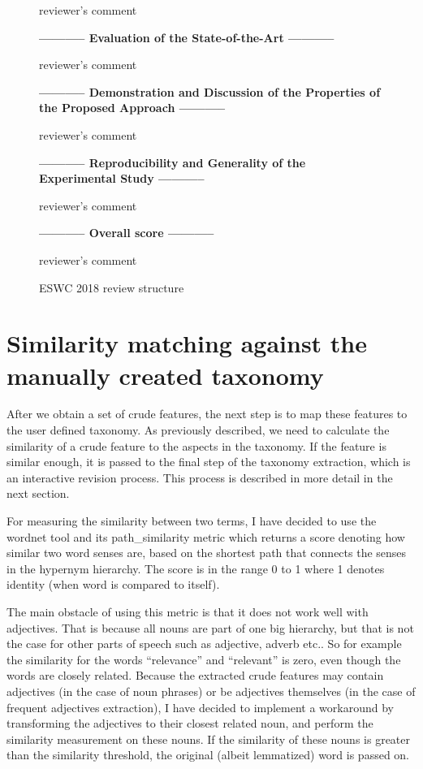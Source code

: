 \begin{figure}[htb]
{\begin{minipage}{0.9\textwidth}
reviewer's comment

\textbf{----------- Evaluation of the State-of-the-Art -----------}

reviewer's comment

\textbf{----------- Demonstration and Discussion of the Properties of the Proposed Approach ----------- }

reviewer's comment

\textbf{----------- Reproducibility and Generality of the Experimental Study ----------- }

reviewer's comment

\textbf{----------- Overall score -----------}

reviewer's comment

\end{minipage}}
\caption{ESWC 2018 review structure}
\label{img:eswc_2018}
\end{figure}

\section{Similarity matching against the manually created taxonomy}
After we obtain a set of crude features, the next step is to map these features to the user defined taxonomy. As previously described, we need to calculate the similarity of a crude feature to the aspects in the taxonomy. If the feature is similar enough, it is passed to the final step of the taxonomy extraction, which is an interactive revision process. This process is described in more detail in the next section.

For measuring the similarity between two terms, I have decided to use the wordnet tool and its path\_similarity metric which returns a score denoting how similar two word senses are, based on the shortest path that connects the senses in the hypernym hierarchy. The score is in the range 0 to 1 where 1 denotes identity (when word is compared to itself). \cite{nltk_ps}

The main obstacle of using this metric is that it does not work well with adjectives. That is because all nouns are part of one big hierarchy, but that is not the case for other parts of speech such as adjective, adverb etc.. So for example the similarity for the words ``relevance'' and ``relevant'' is zero, even though the words are closely related. Because the extracted crude features may contain adjectives (in the case of noun phrases) or be adjectives themselves (in the case of frequent adjectives extraction), I have decided to implement a workaround by transforming the adjectives to their closest related noun, and perform the similarity measurement on these nouns. If the similarity of these nouns is greater than the similarity threshold, the original (albeit lemmatized) word is passed on. 

